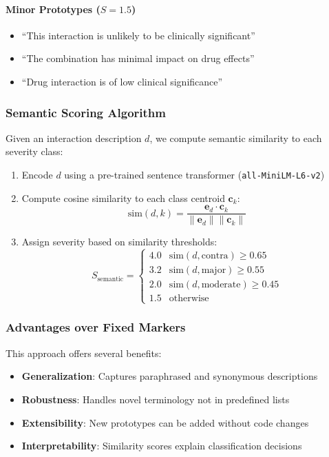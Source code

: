 \documentclass[11pt,a4paper]{article}
\begin{document}
\paragraph{Minor Prototypes ($S = 1.5$)}
\begin{itemize}
    \item ``This interaction is unlikely to be clinically significant''
    \item ``The combination has minimal impact on drug effects''
    \item ``Drug interaction is of low clinical significance''
\end{itemize}

\subsubsection{Semantic Scoring Algorithm}

Given an interaction description $d$, we compute semantic similarity to each severity class:

\begin{enumerate}
    \item Encode $d$ using a pre-trained sentence transformer (\texttt{all-MiniLM-L6-v2})
    \item Compute cosine similarity to each class centroid $\mathbf{c}_k$:
    \begin{equation}
    \text{sim}(d, k) = \frac{\mathbf{e}_d \cdot \mathbf{c}_k}{\|\mathbf{e}_d\| \|\mathbf{c}_k\|}
    \end{equation}
    \item Assign severity based on similarity thresholds:
    \begin{equation}
    S_{\text{semantic}} = 
    \begin{cases}
    4.0 & \text{sim}(d, \text{contra}) \geq 0.65 \\
    3.2 & \text{sim}(d, \text{major}) \geq 0.55 \\
    2.0 & \text{sim}(d, \text{moderate}) \geq 0.45 \\
    1.5 & \text{otherwise}
    \end{cases}
    \end{equation}
\end{enumerate}

\subsubsection{Advantages over Fixed Markers}

This approach offers several benefits:
\begin{itemize}
    \item \textbf{Generalization}: Captures paraphrased and synonymous descriptions
    \item \textbf{Robustness}: Handles novel terminology not in predefined lists
    \item \textbf{Extensibility}: New prototypes can be added without code changes
    \item \textbf{Interpretability}: Similarity scores explain classification decisions
\end{itemize}
\end{document}
